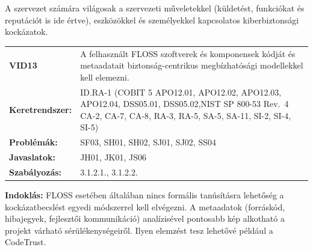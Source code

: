 \documentclass[12pt,magyar,a4paper,oneside]{scrreprt}
\begin{document}
A szervezet számára világosak a szervezeti műveletekkel (küldetést,
funkciókat és reputációt is ide értve), eszközökkel és személyekkel
kapcsolatos kiberbiztonsági kockázatok.

\begin{longtable}[]{@{}ll@{}}
\toprule
\endhead
\begin{minipage}[t]{0.16\columnwidth}\raggedright
\textbf{VID13}\strut
\end{minipage} & \begin{minipage}[t]{0.79\columnwidth}\raggedright
A felhasznált FLOSS szoftverek és komponensek kódját és metaadatait
biztonság-centrikus megbízhatósági modellekkel kell elemezni.\strut
\end{minipage}\tabularnewline
\begin{minipage}[t]{0.16\columnwidth}\raggedright
\textbf{Keretrendszer:}\strut
\end{minipage} & \begin{minipage}[t]{0.79\columnwidth}\raggedright
ID.RA-1 (COBIT 5 APO12.01, APO12.02, APO12.03, APO12.04, DSS05.01,
DSS05.02,NIST SP 800-53 Rev.~4 CA-2, CA-7, CA-8, RA-3, RA-5, SA-5,
SA-11, SI-2, SI-4, SI-5)\strut
\end{minipage}\tabularnewline
\begin{minipage}[t]{0.16\columnwidth}\raggedright
\textbf{Problémák:}\strut
\end{minipage} & \begin{minipage}[t]{0.79\columnwidth}\raggedright
SF03, SH01, SH02, SJ01, SJ02, SS04\strut
\end{minipage}\tabularnewline
\begin{minipage}[t]{0.16\columnwidth}\raggedright
\textbf{Javaslatok:}\strut
\end{minipage} & \begin{minipage}[t]{0.79\columnwidth}\raggedright
JH01, JK01, JS06\strut
\end{minipage}\tabularnewline
\begin{minipage}[t]{0.16\columnwidth}\raggedright
\textbf{Szabályozás:}\strut
\end{minipage} & \begin{minipage}[t]{0.79\columnwidth}\raggedright
3.1.2.1., 3.1.2.2.\strut
\end{minipage}\tabularnewline
\bottomrule
\end{longtable}

\textbf{Indoklás: } FLOSS esetében általában nincs formális tanúsításra
lehetőség a kockázatbecslést egyedi módszerrel kell elvégezni. A
metaadatok (forráskód, hibajegyek, fejlesztői kommunikáció) analízisével
pontosabb kép alkotható a projekt várható sérülékenységeiről. Ilyen
elemzést tesz lehetővé például a CodeTrust.
\end{document}
